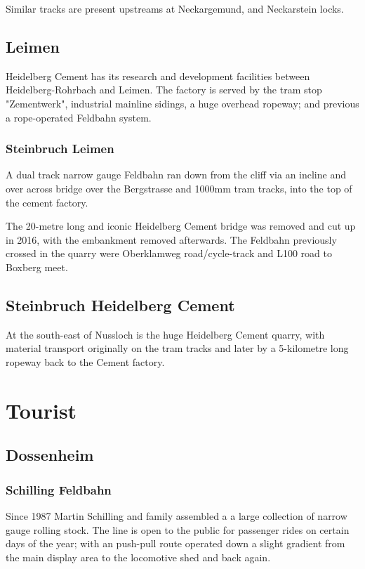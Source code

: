 \documentclass[a4paper]{report}
\begin{document}
Similar tracks are present upstreams at Neckargemund, and Neckarstein locks.

\section{Leimen}

Heidelberg Cement has its research and development facilities between
Heidelberg-Rohrbach and Leimen.  The factory is served by the tram
stop "Zementwerk", industrial mainline sidings, a huge overhead
ropeway; and previous a rope-operated Feldbahn system.

\subsection{Steinbruch Leimen}

A dual track narrow gauge Feldbahn ran down from the cliff via an
incline and over across bridge over the Bergstrasse and 1000mm tram
tracks, into the top of the cement factory.

The 20-metre long and iconic Heidelberg Cement bridge was removed and
cut up in 2016, with the embankment removed afterwards.  The Feldbahn
previously crossed in the quarry were Oberklamweg road/cycle-track and
L100 road to Boxberg meet.

\section{Steinbruch Heidelberg Cement}

At the south-east of Nussloch is the huge Heidelberg Cement quarry,
with material transport originally on the tram tracks and later by a
5-kilometre long ropeway back to the Cement factory.

\chapter{Tourist}
\section{Dossenheim}
\subsection{Schilling Feldbahn}

Since 1987 Martin Schilling and family assembled a a large collection
of narrow gauge rolling stock.  The line is open to the public for
passenger rides on certain days of the year; with an push-pull route
operated down a slight gradient from the main display area to the
locomotive shed and back again.
\end{document}

